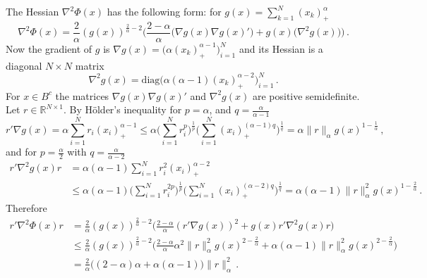 \documentclass[a4paper]{article}
\newcommand{\Real}{\mathbb{R}}
\begin{document}
The Hessian $\nabla^2 \Phi(x)$ has the following form: for $g(x) = \sum_{k=1}^N (x_k)_+^\alpha$
\begin{equation*}
  \nabla^2 \Phi(x)
    = \frac{2}{\alpha} (g(x))^{\frac{2}{\alpha} - 2}
      \biggl( \frac{2 - \alpha}{\alpha} \bigl(\nabla g(x) \nabla g(x)'\bigr)
              + g(x) \bigl(\nabla^2 g(x)\bigr)
      \biggr) \,.
\end{equation*}
Now the gradient of $g$ is $\nabla g(x) = \bigl(\alpha (x_k)_+^{\alpha-1} \bigr)_{i=1}^N$
and its Hessian is a diagonal $N\times N$ matrix
\begin{equation*}
  \nabla^2 g(x) = \text{diag}\bigl(\alpha (\alpha-1) (x_k)_+^{\alpha-2} \bigr)_{i=1}^N \,.
\end{equation*}
For $x\in B^c$ the matrices $\nabla g(x) \nabla g(x)'$ and $\nabla^2 g(x)$ are positive
semidefinite. Let $r\in \Real^{N\times 1}$. By H\"older's inequality for $p=\alpha$, and
$q = \frac{\alpha}{\alpha-1}$
\begin{equation*}
  r' \nabla g(x)
    = \alpha \sum_{i=1}^N r_i (x_i)_+^{\alpha-1}
    \leq \alpha
      \biggl(\sum_{i=1}^N r_i^p\biggr)^\frac{1}{p}
      \biggl(\sum_{i=1}^N (x_i)_+^{(\alpha-1)q} \biggr)^\frac{1}{q}
    = \alpha \|r\|_\alpha g(x)^{1-\frac{1}{\alpha}} \,,
\end{equation*}
and for $p=\frac{\alpha}{2}$ with $q = \frac{\alpha}{\alpha-2}$
\begin{align*}
  r' \nabla^2 g(x) r
    &= \alpha (\alpha-1) \sum_{i=1}^N r_i^2 (x_i)_+^{\alpha-2} \\
    &\leq \alpha (\alpha-1) 
      \biggl(\sum_{i=1}^N r_i^{2p}\biggr)^\frac{1}{p}
      \biggl(\sum_{i=1}^N (x_i)_+^{(\alpha-2)q} \biggr)^\frac{1}{q}
    = \alpha (\alpha-1) \|r\|_\alpha^2 g(x)^{1-\frac{2}{\alpha}} \,.
\end{align*}
Therefore 
\begin{align*}
  r'\nabla^2 \Phi(x)r
    & = \frac{2}{\alpha} (g(x))^{\frac{2}{\alpha} - 2}
      \biggl( \frac{2 - \alpha}{\alpha} (r'\nabla g(x))^2
              + g(x) r'\nabla^2 g(x) r \biggr) \\
    &\leq \frac{2}{\alpha} (g(x))^{\frac{2}{\alpha} - 2}
      \biggl( \frac{2 - \alpha}{\alpha} \alpha^2 \|r\|_\alpha^2 g(x)^{2-\frac{2}{\alpha}}
              + \alpha (\alpha-1) \|r\|_\alpha^2 g(x)^{2-\frac{2}{\alpha}}
      \biggr) \\
    &=\frac{2}{\alpha} \bigl( (2 - \alpha) \alpha + \alpha (\alpha - 1) \bigr) \|r\|_\alpha^2\,.
\end{align*}




\end{document}
